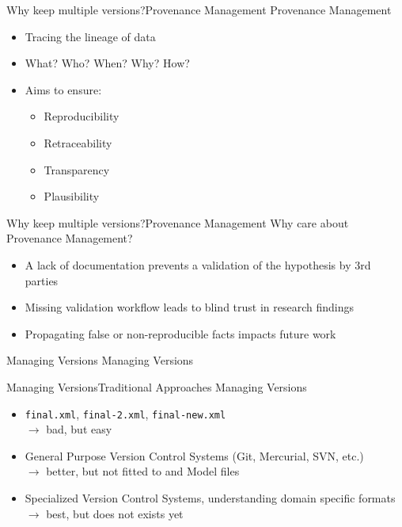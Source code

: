 \begin{frame}{Why keep multiple versions?}{Provenance Management}
	{\Large Provenance Management}
	\\[2.5em]
	\begin{itemize}
		\item Tracing the lineage of data
		\item What? Who? When? Why? How?
		\item Aims to ensure: \citep{Meyer2015}
		\begin{itemize}
			\item Reproducibility
			\item Retraceability
			\item Transparency
			\item Plausibility
		\end{itemize}
	\end{itemize}
\end{frame}

\begin{frame}{Why keep multiple versions?}{Provenance Management}
	{\Large Why care about Provenance Management?}
	\\[2.5em]
	\begin{itemize}
		\item A lack of documentation prevents a validation of the hypothesis by 3rd parties \citep{Mesirov2010, Peng2011}
		\item Missing validation workflow leads to blind trust in research findings
		\item Propagating false or non-reproducible facts impacts future work
	\end{itemize}

\end{frame}

\begin{frame}{Managing Versions}{}
	\centering
	\LARGE Managing Versions
\end{frame}

\begin{frame}{Managing Versions}{Traditional Approaches}
	{\Large Managing Versions}
	\\[2.5em]
	\begin{itemize}
		\item \texttt{final.xml}, \texttt{final-2.xml}, \texttt{final-new.xml} \\
			$\rightarrow$ bad, but easy
		
		\item General Purpose Version Control Systems (Git, Mercurial, SVN, etc.) \\
			$\rightarrow$ better, but not fitted to \xml and Model files
			
		\item Specialized Version Control Systems, understanding domain specific formats \\
			$\rightarrow$ best, but does not exists yet
	\end{itemize}
\end{frame}

